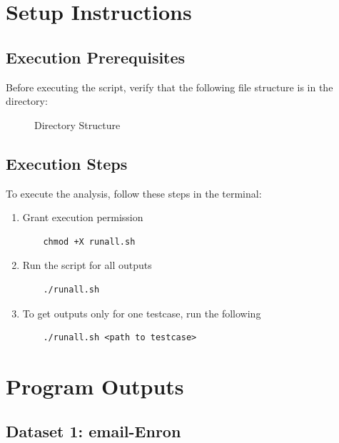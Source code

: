 \documentclass[12pt,a4paper]{article}
\begin{document}
\section{Setup Instructions}
\subsection{Execution Prerequisites}
Before executing the script, verify that the following file structure is in the directory:

\begin{figure}[ht]
\centering
\begin{minipage}{0.4\textwidth} %
\end{minipage}
\caption{Directory Structure}
\label{fig:dir_structure}
\end{figure}
\subsection{Execution Steps}
To execute the analysis, follow these steps in the terminal:

\begin{enumerate}
    \item Grant execution permission
    \begin{verbatim}
    chmod +X runall.sh
    \end{verbatim}
    
    \item Run the script for all outputs
    \begin{verbatim}
    ./runall.sh
    \end{verbatim}

    \item To get outputs only for one testcase, run the following
    \begin{verbatim}
    ./runall.sh <path to testcase>
    \end{verbatim}
\end{enumerate}
\pagebreak

\section{Program Outputs}

\subsection{Dataset 1: email-Enron}
\end{document}
